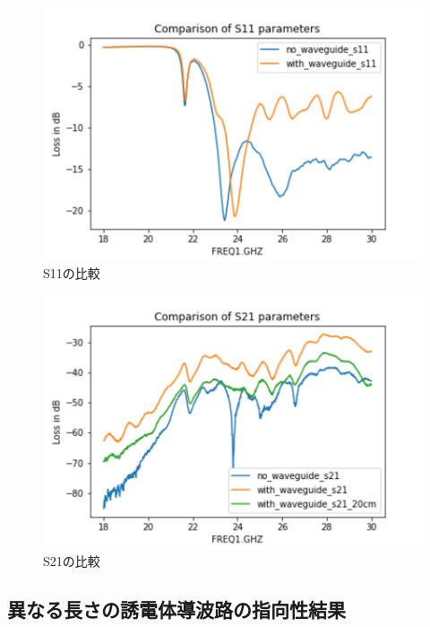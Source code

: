 \documentclass[technicalreport]{ieicej}
\begin{document}
\begin{figure}[tb]
  \begin{center}
    \includegraphics[bb=0 0 432.098422 288.065615, width=1.0\linewidth]{img/s11_comparison.pdf}
    \caption{S11の比較}
    \label{fig:s11_comparison}
  \end{center}
\end{figure}


\begin{figure}[tb]
  \begin{center}
    \includegraphics[bb=0 0 432.098422 288.065615, width=1.0\linewidth]{img/s21_comparison.pdf}
    \caption{S21の比較}
    \label{fig:s21_comparison}
  \end{center}
\end{figure}

\subsection{異なる長さの誘電体導波路の指向性結果}
\end{document}
